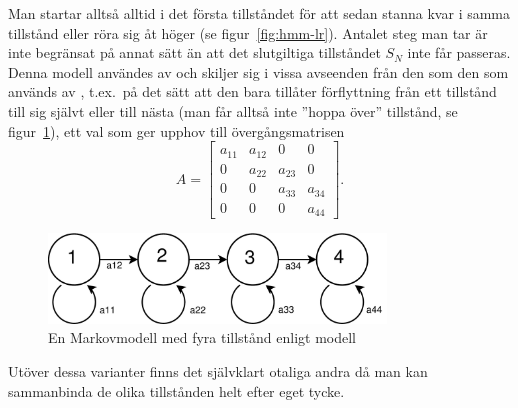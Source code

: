 \documentclass[../rapport_MVEX01-11-05]{subfiles}
\begin{document}
Man startar alltså alltid i det första tillståndet för att sedan
stanna kvar i samma tillstånd eller röra sig åt höger (se
figur~\ref{fig:hmm-lr}). Antalet steg
man tar är inte begränsat på annat sätt än att det slutgiltiga
tillståndet $S_N$ inte får passeras. Denna modell användes av
 och skiljer sig i vissa avseenden från
den som den som används av , t.ex.~på det sätt att
den bara tillåter förflyttning från
ett tillstånd till sig självt eller till nästa (man får alltså inte ''hoppa
över'' tillstånd, se figur~\ref{fig:hmm-lrb}), ett val som ger upphov
till övergångsmatrisen
\begin{equation*}
A = \begin{bmatrix}
a_{11} & a_{12} & 0 & 0\\
0 & a_{22} & a_{23} & 0\\
0 & 0 & a_{33} & a_{34}\\
0 & 0 & 0 & a_{44}
\end{bmatrix}.  
\end{equation*} 

\begin{figure}[tb]
  \centering
  \includegraphics[width=0.8\textwidth]{bilder/LRB_HMM}
  \caption{En Markovmodell med fyra tillstånd enligt
  \protect{} modell}
  \label{fig:hmm-lrb}
\end{figure}

Utöver dessa varianter finns det självklart otaliga andra då man kan
sammanbinda de olika tillstånden helt efter eget tycke.
\end{document}
